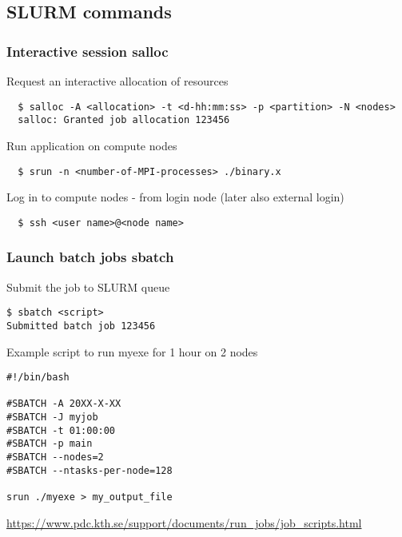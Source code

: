 \subsection*{SLURM commands}

\begin{frame}[fragile]
\frametitle{Interactive session \hfill \alert{\textbf{salloc}}}

\begin{exampleblock}{Request an interactive allocation of resources}
  \footnotesize
  \begin{verbatim}
  $ salloc -A <allocation> -t <d-hh:mm:ss> -p <partition> -N <nodes>
  salloc: Granted job allocation 123456
  \end{verbatim}
\end{exampleblock}

\begin{exampleblock}{Run application on compute nodes}
  \footnotesize
  \begin{verbatim}
  $ srun -n <number-of-MPI-processes> ./binary.x
  \end{verbatim}
\end{exampleblock}

\begin{exampleblock}{Log in to compute nodes - from login node (later also external login)}
  \footnotesize
  \begin{verbatim}
  $ ssh <user name>@<node name>
  \end{verbatim}
\end{exampleblock}
  
\end{frame}

\begin{frame}[fragile]
\frametitle{Launch batch jobs \hfill  \alert{\textbf{sbatch}}}
\begin{exampleblock}{Submit the job to SLURM queue}
\footnotesize
\begin{verbatim}
$ sbatch <script>
Submitted batch job 123456
\end{verbatim}
\end{exampleblock}

\begin{exampleblock}{Example script to run myexe for 1 hour on 2 nodes}
\footnotesize
\begin{verbatim}
#!/bin/bash

#SBATCH -A 20XX-X-XX
#SBATCH -J myjob
#SBATCH -t 01:00:00
#SBATCH -p main
#SBATCH --nodes=2
#SBATCH --ntasks-per-node=128

srun ./myexe > my_output_file
\end{verbatim}
\end{exampleblock}

\scriptsize
\href{https://www.pdc.kth.se/support/documents/run\_jobs/job\_scripts.html}{https://www.pdc.kth.se/support/documents/run\_jobs/job\_scripts.html}
\end{frame}

